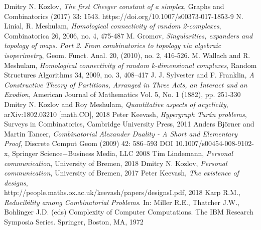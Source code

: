 \documentclass[11pt,english,onehalfspacing,headsepline]{MastersDoctoralThesis}
\begin{document}
\begin{thebibliography}{1}
Dmitry N. Kozlov, \textit{The first Cheeger constant of a simplex}, Graphs and Combinatorics (2017) 33: 1543. https://doi.org/10.1007/s00373-017-1853-9
N. Linial, R. Meshulam, \textit{Homological connectivity of random 2-complexes}, Combinatorica 26, 2006,
no. 4, 475-487
M. Gromov, \textit{Singularities, expanders and topology of maps. Part 2. From combinatorics to topology
via algebraic isoperimetry}, Geom. Funct. Anal. 20, (2010), no. 2, 416-526.
M. Wallach and R. Meshulam, \textit{Homological connectivity of random k-dimensional complexes}, Random Structures Algorithms 34, 2009, no. 3, 408–417
J. J. Sylvester and F. Franklin, \textit{A Constructive Theory of Partitions, Arranged in Three Acts, an Interact and an Exodion}, American Journal of Mathematics
Vol. 5, No. 1 (1882), pp. 251-330
 Dmitry N. Kozlov and Roy Meshulam, \textit{Quantitative aspects of acyclicity}, arXiv:1802.03210 [math.CO], 2018
 Peter Keevash, \textit{Hypergraph Tur\'{a}n problems}, Surveys in Combinatorics, Cambridge University Press, 2011
 Anders Björner and Martin Tancer, \textit{Combinatorial Alexander Duality - A Short and Elementary Proof}, Discrete Comput Geom (2009) 42: 586–593 DOI 10.1007/s00454-008-9102-x, Springer Science+Business Media, LLC 2008
 Tim Lindemann, \textit{Personal communication}, University of Bremen, 2018
 Dmitry N. Kozlov, \textit{Personal communication}, University of Bremen, 2017
 Peter Keevash, \textit{The existence of designs},\\ http://people.maths.ox.ac.uk/keevash/papers/designsI.pdf, 2018
 Karp R.M., \textit{Reducibility among Combinatorial Problems}. In: Miller R.E., Thatcher J.W., Bohlinger J.D. (eds) Complexity of Computer Computations. The IBM Research Symposia Series. Springer, Boston, MA, 1972
\end{thebibliography}

\printindex
\end{document}
